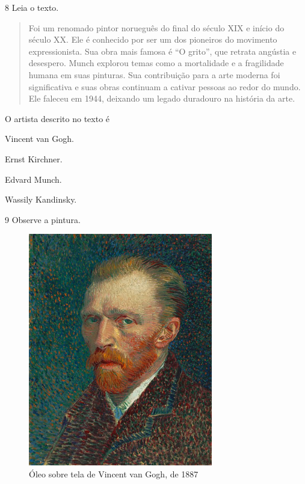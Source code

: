 \num{8} Leia o texto.

\begin{quote}
Foi um renomado pintor norueguês do final do século XIX e início do século XX. 
Ele é conhecido por ser um dos pioneiros do movimento expressionista. Sua obra 
mais famosa é ``O grito'', que retrata angústia e desespero. Munch explorou temas 
como a mortalidade e a fragilidade humana em suas pinturas. Sua contribuição para 
a arte moderna foi significativa e suas obras continuam a cativar pessoas ao redor 
do mundo. Ele faleceu em 1944, deixando um legado duradouro na história da arte.

\end{quote}

\pagebreak
O artista descrito no texto é

\begin{escolha}
\item
  Vincent van Gogh.
\item
  Ernst Kirchner.
\item
  Edvard Munch.
\item
  Wassily Kandinsky.
\end{escolha}




\num{9} Observe a pintura.

\begin{figure}[htpb!]
\centering
\includegraphics[width=3.16667in,height=4.01042in]{media/image28.png}
\caption{Óleo sobre tela de Vincent van Gogh, de 1887}
\end{figure}

